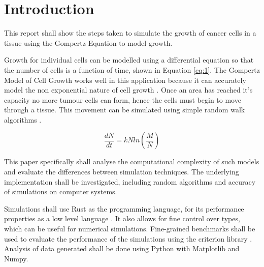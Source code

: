 \chapter{Introduction}

This report shall show the steps taken to simulate the growth of cancer cells in a tissue using the Gompertz Equation to model growth.

Growth for individual cells can be modelled using a differential equation so that the number of cells is a function of time, shown in Equation \ref{eq:1}.
The Gompertz Model of Cell Growth works well in this application because it can accurately model the non exponential nature of cell growth \autocite{tatroMathematicsCancerFitting2018}.
Once an area has reached it's capacity no more tumour cells can form, hence the cells must begin to move through a tissue.
This movement can be simulated using simple random walk algorithms \autocite{codlingRandomWalkModels2008}.

\begin{equation}
    \frac{dN}{dt} = kNln\left(\frac{M}{N} \right) \label{eq:1}
\end{equation}

This paper specifically shall analyse the computational complexity of such models and evaluate the differences between simulation techniques.
The underlying implementation shall be investigated, including random algorithms and accuracy of simulations on computer systems.

Simulations shall use Rust as the programming language, for its performance properties as a low level language \autocite{adamRustConciseOverview2023}.
It also allows for fine control over types, which can be useful for numerical simulations.
Fine-grained benchmarks shall be used to evaluate the performance of the simulations using the criterion library \autocite{heislerBheislerCriterionRs2024}.
Analysis of data generated shall be done using Python with Matplotlib and Numpy.